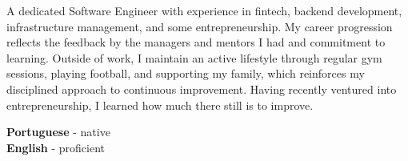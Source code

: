 \documentclass[9pt]{lib/developercv} %
\begin{document}
\begin{minipage}[t]{0.75\textwidth} %
	\vspace{-\baselineskip} %


	A dedicated Software Engineer with experience in fintech, backend development, infrastructure management, and some entrepreneurship. My career progression reflects the feedback by the managers and mentors I had and commitment to learning. Outside of work, I maintain an active lifestyle through regular gym sessions, playing football, and supporting my family, which reinforces my disciplined approach to continuous improvement. Having recently ventured into entrepreneurship, I learned how much there still is to improve.
\end{minipage}
\hfill %
\begin{minipage}[t]{0.2\textwidth} %
	\vspace{-\baselineskip} %


	\textbf{Portuguese} - native\\
	\textbf{English} - proficient

\end{minipage}


\end{document}
